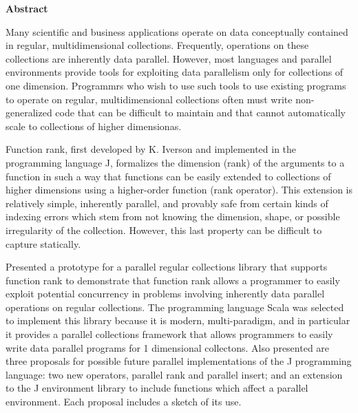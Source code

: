 \begin{center}

\bigskip

\begin{Large}
\textbf{\theTitle}
\end{Large}

\bigskip

\begin{large}
\theAuthor
\end{large}

\bigskip
\bigskip

\textbf{Abstract}

\end{center}

\noindent
Many scientific and business applications operate on 
data conceptually contained in regular, multidimensional collections.
Frequently, operations on these collections are inherently data parallel.
However, most languages and parallel environments 
provide tools for exploiting data parallelism only for collections of one dimension.
Programmrs who wish to use such tools to use existing programs to operate on regular, multidimensional collections
often must write non-generalized code that can be difficult to maintain and 
that cannot automatically scale to collections of higher dimensionas.

Function rank, first developed by K. Iverson and implemented in the programming language J, 
formalizes the dimension (rank) of the arguments to a function in such a way 
that functions can be easily extended to collections of higher dimensions using a higher-order function (rank operator).
This extension is relatively simple, inherently parallel, and provably safe 
from certain kinds of indexing errors which stem from not knowing the dimension, shape, or possible irregularity of the collection.
However, this last property can be difficult to capture statically.

Presented a prototype for a parallel regular collections library that supports function rank 
to demonstrate that function rank allows a programmer to easily exploit potential concurrency 
in problems involving inherently data parallel operations on regular collections.
The programming language Scala was selected to implement this library because it is modern, multi-paradigm, 
and in particular it provides a parallel collections framework that 
allows programmers to easily write data parallel programs for 1 dimensional collectons.
Also presented are three proposals for possible future parallel implementations of the J programming language:
two new operators, parallel rank and parallel insert;
and an extension to the J environment library to include functions which affect a parallel environment.
Each proposal includes a sketch of its use.

